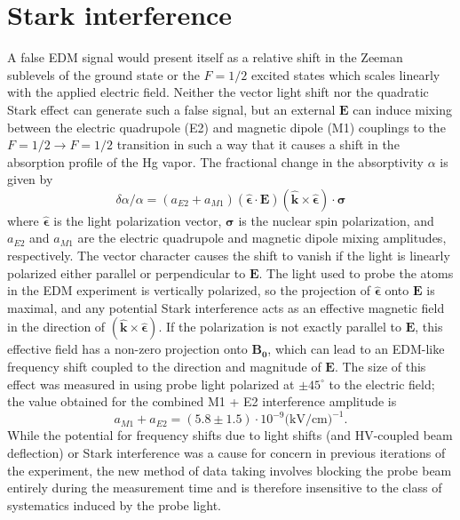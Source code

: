 \documentclass [10pt, twoside] {uwthesis}[2012/04/02]
\begin{document}
\section{Stark interference}
A false EDM signal would present itself as a relative shift in the Zeeman sublevels of the ground state or the $F=1/2$ excited states which scales linearly with the applied electric field. Neither the vector light shift nor the quadratic Stark effect can generate such a false signal, but an external $\mathbf{E}$ can induce mixing between the electric quadrupole (E2) and magnetic dipole (M1) couplings to the $F=1/2 \rightarrow F=1/2$ transition in such a way that it causes a shift in the absorption profile of the Hg vapor. The fractional change in the absorptivity $\alpha$ is given by \cite{Griffith}
\begin{equation}
\delta\alpha/\alpha = (a_{E2}+a_{M1})(\hat{\mathbf{\epsilon}}\cdot\mathbf{E})(\hat{\mathbf{k}}\times\hat{\mathbf{\epsilon}})\cdot\mathbf{\sigma}
\end{equation}
where $\hat{\mathbf{\epsilon}}$ is the light polarization vector, $\mathbf{\sigma}$ is the nuclear spin polarization, and $a_{E2}$ and $a_{M1}$ are the electric quadrupole and magnetic dipole mixing amplitudes, respectively. The vector character causes the shift to vanish if the light is linearly polarized either parallel or perpendicular to $\mathbf{E}$. The light used to probe the atoms in the EDM experiment is vertically polarized, so the projection of $\mathbf{\hat{\epsilon}}$ onto $\mathbf{E}$ is maximal, and any potential Stark interference acts as an effective magnetic field in the direction of $(\hat{\mathbf{k}}\times\hat{\mathbf{\epsilon}})$. If the polarization is not exactly parallel to $\mathbf{E}$, this effective field has a non-zero projection onto $\mathbf{B_0}$, which can lead to an EDM-like frequency shift coupled to the direction and magnitude of $\mathbf{E}$. The size of this effect was measured in \cite{2011_Hg_Stark_Interference} using probe light polarized at $\pm45^{\circ}$ to the electric field; the value obtained for the combined M1 + E2 interference amplitude is
\begin{equation}
a_{M1}+a_{E2} = (5.8 \pm 1.5) \cdot 10^{-9} \text{(kV/cm)}^{-1}.
\end{equation}
While the potential for frequency shifts due to light shifts (and HV-coupled beam deflection) or Stark interference was a cause for concern in previous iterations of the experiment, the new method of data taking involves blocking the probe beam entirely during the measurement time and is therefore insensitive to the class of systematics induced by the probe light.
\end{document}
